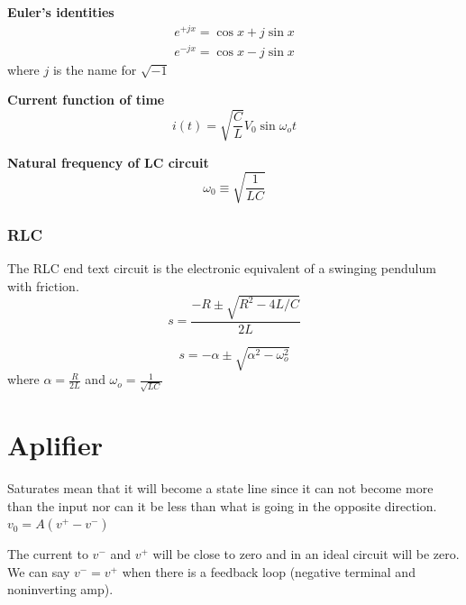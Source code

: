 \documentclass{article}
\begin{document}
\noindent\textbf{Euler's identities}
\begin{align*}
  e^{+jx} = \cos{x} + j\sin{x} \\
  e^{-jx} = \cos{x} - j\sin{x}
\end{align*}
where $j$ is the name for $\sqrt{-1}$

\noindent\textbf{Current function of time}
\begin{equation}
  i(t)=\sqrt{\frac{C}{L}}V_0\sin \omega_o t
\end{equation}

\noindent\textbf{Natural frequency of LC circuit}
\begin{equation}
  \omega_0 \equiv  \sqrt{\frac{1}{LC}}
\end{equation}


\subsubsection{RLC}
The RLC end text circuit is the electronic equivalent of a swinging pendulum with friction.
\begin{equation}
  s = \frac{-R\pm\sqrt{R^2-4L/C}}{2L}
\end{equation}

\begin{equation}
  s = -\alpha  \pm \sqrt{\alpha^2 - \omega^2_o}
\end{equation}
where $\alpha=\frac{R}{2L}$ and $\omega_o=\frac{1}{\sqrt{LC}}$

\newpage
\section{Aplifier}
Saturates mean that it will become a state line since it can not become more than the input nor can it be less than what is going in the opposite direction.
$v_0=A(v^+-v^-)$ \newline

The current to $v^-$ and $v^+$ will be close to zero and in an ideal circuit will
be zero. \newline
We can say $v^- = v^+$ when there is a feedback loop (negative terminal and noninverting amp). 
\end{document}
